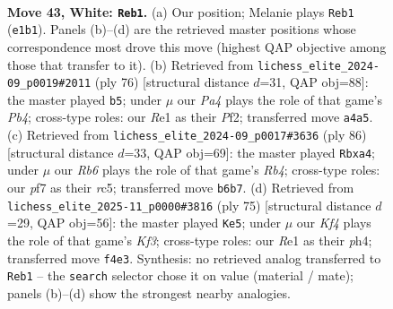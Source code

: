 \documentclass[11pt]{article}
\begin{document}
\clearpage

\begin{figure}[p]\centering
\begin{subfigure}{0.46\textwidth}\centering
\resizebox{\linewidth}{!}{%
\newchessgame
\chessboard[
  setfen={1r6/1p3p2/pR2pk2/8/P3PK2/5P1P/7P/4R3 w - - 15 43},
  showmover=false,
  pgfstyle=straightmove, color=movearrow, markmove={e1-b1}
]}
\caption{}
\end{subfigure}\hfill
\begin{subfigure}{0.46\textwidth}\centering
\resizebox{\linewidth}{!}{%
\newchessgame
\chessboard[
  setfen={8/5p2/rpR1pk1p/6p1/1P6/6PP/5P1K/8 w - - 2 39},
  showmover=false,
  pgfstyle=straightmove, color=movearrow, markmove={b4-b5}
]}
\caption{}
\end{subfigure}
\\[4pt]
\begin{subfigure}{0.46\textwidth}\centering
\resizebox{\linewidth}{!}{%
\newchessgame
\chessboard[
  setfen={r7/8/8/2r1kp2/pR6/1p3KP1/1P3P2/R7 w - - 0 44},
  showmover=false,
  pgfstyle=straightmove, color=movearrow, markmove={b4-a4}
]}
\caption{}
\end{subfigure}\hfill
\begin{subfigure}{0.46\textwidth}\centering
\resizebox{\linewidth}{!}{%
\newchessgame
\chessboard[
  setfen={1R6/4pp2/2p2kp1/7p/P6P/1P3KP1/1r3P2/8 b - - 4 38},
  showmover=false,
  pgfstyle=straightmove, color=movearrow, markmove={f6-e5}
]}
\caption{}
\end{subfigure}
\caption{\textbf{Move 43, White: \texttt{Reb1}.} (a) Our position; Melanie plays \texttt{Reb1} (\texttt{e1b1}). Panels (b)--(d) are the retrieved master positions whose correspondence most drove this move (highest QAP objective among those that transfer to it). (b) Retrieved from \texttt{lichess\_elite\_2024-09\_p0019\#2011} (ply 76) [structural distance $d$=31, QAP obj=88]: the master played \texttt{b5}; under $\mu$ our \emph{Pa4} plays the role of that game's \emph{Pb4}; cross-type roles: our \emph{R}e1 as their \emph{P}f2; transferred move \texttt{a4a5}. (c) Retrieved from \texttt{lichess\_elite\_2024-09\_p0017\#3636} (ply 86) [structural distance $d$=33, QAP obj=69]: the master played \texttt{Rbxa4}; under $\mu$ our \emph{Rb6} plays the role of that game's \emph{Rb4}; cross-type roles: our \emph{p}f7 as their \emph{r}c5; transferred move \texttt{b6b7}. (d) Retrieved from \texttt{lichess\_elite\_2025-11\_p0000\#3816} (ply 75) [structural distance $d$=29, QAP obj=56]: the master played \texttt{Ke5}; under $\mu$ our \emph{Kf4} plays the role of that game's \emph{Kf3}; cross-type roles: our \emph{R}e1 as their \emph{p}h4; transferred move \texttt{f4e3}. Synthesis: no retrieved analog transferred to \texttt{Reb1} -- the \texttt{search} selector chose it on value (material / mate); panels (b)--(d) show the strongest nearby analogies.}
\label{fig:thought-m84}
\end{figure}
\end{document}
